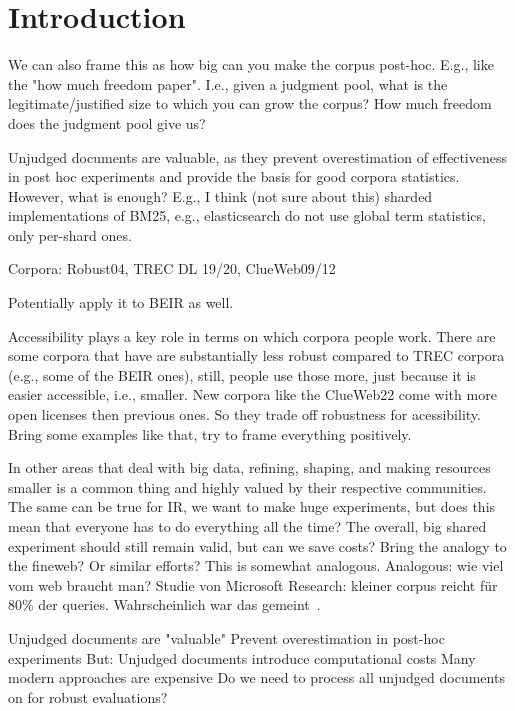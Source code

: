 \section{Introduction}



We can also frame this as how big can you make the corpus post-hoc. E.g., like the "how much freedom paper". I.e., given a judgment pool, what is the legitimate/justified size to which you can grow the corpus? How much freedom does the judgment pool give us?

Unjudged documents are valuable, as they prevent overestimation of effectiveness in post hoc experiments and provide the basis for good corpora statistics. However, what is enough? E.g., I think (not sure about this) sharded implementations of BM25, e.g., elasticsearch do not use global term statistics, only per-shard ones.

Corpora: Robust04, TREC DL 19/20, ClueWeb09/12

Potentially apply it to BEIR as well.


Accessibility plays a key role in terms on which corpora people work. There are some corpora that have are substantially less robust compared to TREC corpora (e.g., some of the BEIR ones), still, people use those more, just because it is easier accessible, i.e., smaller. New corpora like the ClueWeb22 come with more open licenses then previous ones. So they trade off robustness for acessibility. Bring some examples like that, try to frame everything positively.

In other areas that deal with big data, refining, shaping, and making resources smaller is a common thing and highly valued by their respective communities. The same can be true for IR, we want to make huge experiments, but does this mean that everyone has to do everything all the time? The overall, big shared experiment should still remain valid, but can we save costs?
Bring the analogy to the fineweb? Or similar efforts? This is somewhat analogous. Analogous: wie viel vom web braucht man? Studie von Microsoft Research: kleiner corpus reicht für 80\% der queries. Wahrscheinlich war das gemeint~\cite{mei:2008}.


Unjudged documents are "valuable"
Prevent overestimation in post-hoc experiments
But: Unjudged documents introduce computational costs
Many modern approaches are expensive
Do we need to process all unjudged documents on for robust evaluations?




